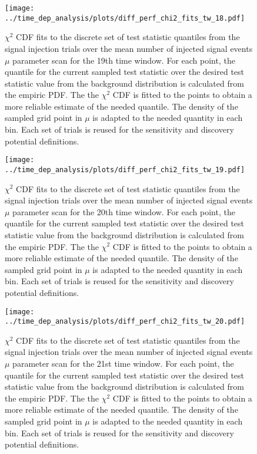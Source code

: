 \begin{figure}[H]
  \centering
  \texttt{[image: ../time\_dep\_analysis/plots/diff\_perf\_chi2\_fits\_tw\_18.pdf]}
  \caption[$\chi^2$ CDF fits for the 19th time window differential performance]{
     $\chi^2$ CDF fits to the discrete set of test statistic quantiles from the signal injection trials over the mean number of injected signal events $\mu$ parameter scan for the 19th time window.
     For each point, the quantile for the current sampled test statistic over the desired test statistic value from the background distribution is calculated from the empiric PDF.
     The the $\chi^2$ CDF is fitted to the points to obtain a more reliable estimate of the needed quantile.
     The density of the sampled grid point in $\mu$ is adapted to the needed quantity in each bin.
     Each set of trials is reused for the sensitivity and discovery potential definitions.
  }
  \label{fig:diff_perf_chi2_fits_tw_18}
\end{figure}
\begin{figure}[H]
  \centering
  \texttt{[image: ../time\_dep\_analysis/plots/diff\_perf\_chi2\_fits\_tw\_19.pdf]}
  \caption[$\chi^2$ CDF fits for the 20th time window differential performance]{
     $\chi^2$ CDF fits to the discrete set of test statistic quantiles from the signal injection trials over the mean number of injected signal events $\mu$ parameter scan for the 20th time window.
     For each point, the quantile for the current sampled test statistic over the desired test statistic value from the background distribution is calculated from the empiric PDF.
     The the $\chi^2$ CDF is fitted to the points to obtain a more reliable estimate of the needed quantile.
     The density of the sampled grid point in $\mu$ is adapted to the needed quantity in each bin.
     Each set of trials is reused for the sensitivity and discovery potential definitions.
  }
  \label{fig:diff_perf_chi2_fits_tw_19}
\end{figure}
\begin{figure}[H]
  \centering
  \texttt{[image: ../time\_dep\_analysis/plots/diff\_perf\_chi2\_fits\_tw\_20.pdf]}
  \caption[$\chi^2$ CDF fits for the 21st time window differential performance]{
     $\chi^2$ CDF fits to the discrete set of test statistic quantiles from the signal injection trials over the mean number of injected signal events $\mu$ parameter scan for the 21st time window.
     For each point, the quantile for the current sampled test statistic over the desired test statistic value from the background distribution is calculated from the empiric PDF.
     The the $\chi^2$ CDF is fitted to the points to obtain a more reliable estimate of the needed quantile.
     The density of the sampled grid point in $\mu$ is adapted to the needed quantity in each bin.
     Each set of trials is reused for the sensitivity and discovery potential definitions.
  }
  \label{fig:diff_perf_chi2_fits_tw_20}
\end{figure}
